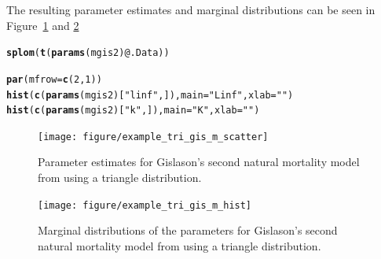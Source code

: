 \documentclass[a4paper,english,10pt]{article}\usepackage[]{graphicx}\usepackage[]{color}
\makeatletter
\newcommand{\hlnum}[1]{\textcolor[rgb]{0.686,0.059,0.569}{#1}}%
\newcommand{\hlstr}[1]{\textcolor[rgb]{0.192,0.494,0.8}{#1}}%
\newcommand{\hlopt}[1]{\textcolor[rgb]{0,0,0}{#1}}%
\newcommand{\hlstd}[1]{\textcolor[rgb]{0.345,0.345,0.345}{#1}}%
\newcommand{\hlkwc}[1]{\textcolor[rgb]{0.333,0.667,0.333}{#1}}%
\newcommand{\hlkwd}[1]{\textcolor[rgb]{0.737,0.353,0.396}{\textbf{#1}}}%
\newenvironment{kframe}{%
 \def\at@end@of@kframe{}%
 \ifinner\ifhmode%
  \def\at@end@of@kframe{\end{minipage}}%
  \begin{minipage}{\columnwidth}%
 \fi\fi%
 \def\FrameCommand##1{\hskip\@totalleftmargin \hskip-\fboxsep
 \colorbox{shadecolor}{##1}\hskip-\fboxsep
     \hskip-\linewidth \hskip-\@totalleftmargin \hskip\columnwidth}%
 \MakeFramed {\advance\hsize-\width
   \@totalleftmargin\z@ \linewidth\hsize
   \@setminipage}}%
 {\par\unskip\endMakeFramed%
 \at@end@of@kframe}
\newenvironment{knitrout}{}{} %
\makeatother
\begin{document}
The resulting parameter estimates and marginal distributions can be seen in Figure~\ref{fig:plot_tri_gis_m} and \ref{fig:plot_tri_gis_m_hist}

\begin{knitrout}
\color{fgcolor}\begin{kframe}
\begin{alltt}
\hlkwd{splom}\hlstd{(}\hlkwd{t}\hlstd{(}\hlkwd{params}\hlstd{(mgis2)}\hlopt{@}\hlkwc{.Data}\hlstd{))}
\end{alltt}
\end{kframe}
\end{knitrout}


\begin{knitrout}
\color{fgcolor}\begin{kframe}
\begin{alltt}
\hlkwd{par}\hlstd{(}\hlkwc{mfrow} \hlstd{=} \hlkwd{c}\hlstd{(}\hlnum{2}\hlstd{,} \hlnum{1}\hlstd{))}
\hlkwd{hist}\hlstd{(}\hlkwd{c}\hlstd{(}\hlkwd{params}\hlstd{(mgis2)[}\hlstr{"linf"}\hlstd{, ]),} \hlkwc{main} \hlstd{=} \hlstr{"Linf"}\hlstd{,} \hlkwc{xlab} \hlstd{=} \hlstr{""}\hlstd{)}
\hlkwd{hist}\hlstd{(}\hlkwd{c}\hlstd{(}\hlkwd{params}\hlstd{(mgis2)[}\hlstr{"k"}\hlstd{, ]),} \hlkwc{main} \hlstd{=} \hlstr{"K"}\hlstd{,} \hlkwc{xlab} \hlstd{=} \hlstr{""}\hlstd{)}
\end{alltt}
\end{kframe}
\end{knitrout}


\begin{figure}[h]
\begin{knitrout}
\color{fgcolor}

{\centering \texttt{[image: figure/example\_tri\_gis\_m\_scatter]} 

}



\end{knitrout}

\caption{Parameter estimates for Gislason's second natural mortality model from using a triangle distribution.}
\label{fig:plot_tri_gis_m}
\end{figure}

\begin{figure}[h]
\begin{knitrout}
\color{fgcolor}

{\centering \texttt{[image: figure/example\_tri\_gis\_m\_hist]} 

}



\end{knitrout}

\caption{Marginal distributions of the parameters for Gislason's second natural mortality model from using a triangle distribution.}
\label{fig:plot_tri_gis_m_hist}
\end{figure}
\end{document}
